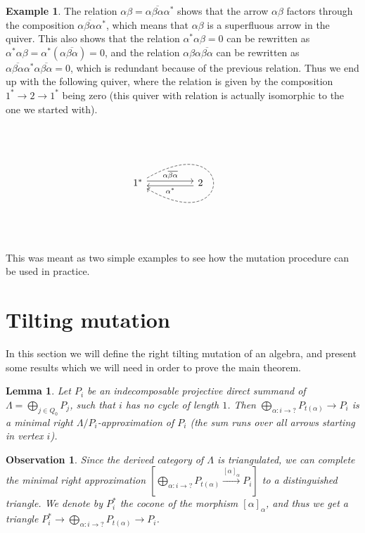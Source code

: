 \documentclass[12pt, dvipsnames, oneside]{amsart}
\newtheorem{lemma}[theorem]{Lemma}
\newtheorem{observation}[theorem]{Observation}
\theoremstyle{definition}
\newtheorem{example}{Example}[section]
\begin{document}
\begin{example}
The relation $\alpha\beta = \alpha\overline{\beta\alpha}\alpha^*$ shows that the arrow $\alpha\beta$ factors through the composition $\alpha\overline{\beta\alpha}\alpha^*$, which means that $\alpha\beta$ is a superfluous arrow in the quiver. This also shows that the relation $\alpha^*\alpha\beta = 0$ can be rewritten as $\alpha^*\alpha\beta = \alpha^* (\alpha\overline{\beta\alpha}) = 0$, and the relation $\alpha\beta\alpha\overline{\beta\alpha}$ can be rewritten as $\alpha\overline{\beta\alpha}\alpha^*\alpha\overline{\beta\alpha} = 0$, which is redundant because of the previous relation. Thus we end up with the following quiver, where the relation is given by the composition $1^*\rightarrow 2\rightarrow 1^*$ being zero (this quiver with relation is actually isomorphic to the one we started with).

\begin{equation*}
\begin{tikzcd}
1^* \arrow[rr, shift left, "\alpha\overline{\beta\alpha}"] \arrow[out=30,in=330,loop,looseness=25, dashed] & & 2 \arrow[ll, shift left, "\alpha^*"]
\end{tikzcd}
\end{equation*}

\end{example}

This was meant as two simple examples to see how the mutation procedure can be used in practice. 

\section{Tilting mutation}
In this section we will define the right tilting mutation of an algebra, and present some results which we will need in order to prove the main theorem.

\begin{lemma}\label{lemma:minrightapprox}
Let $P_i$ be an indecomposable projective direct summand of $\Lambda=\bigoplus\limits_{j\in Q_0} P_j$, such that $i$ has no cycle of length $1$. Then $\bigoplus\limits_{\alpha:i \rightarrow ?} P_{t(\alpha)} \rightarrow P_i$ is a minimal right $\Lambda/P_i$-approximation of $P_i$ (the sum runs over all arrows starting in vertex $i$).
\end{lemma} 

\bigskip

\begin{observation}\label{obs:mutationTriangle}
Since the derived category of $\Lambda$ is triangulated, we can complete the minimal right approximation $\left[ \bigoplus\limits_{\alpha:i\rightarrow?} P_{t(\alpha)} \xrightarrow{[\alpha]_{\alpha}} P_i \right]$ to a distinguished triangle. We denote by $P_i^*$ the cocone of the morphism $[\alpha]_{\alpha}$, and thus we get a triangle $P_i^*\rightarrow \bigoplus\limits_{\alpha:i\rightarrow?} P_{t(\alpha)} \rightarrow P_i $.
\end{observation}
\end{document}
